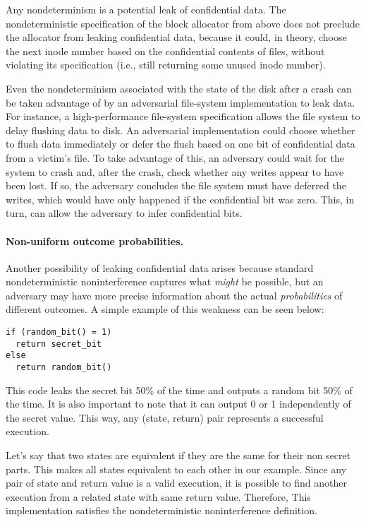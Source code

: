 Any nondeterminism is a potential leak of confidential data.  The
nondeterministic specification of the block allocator from above does not
preclude the allocator from leaking confidential data, because it could,
in theory, choose the next inode number based on the confidential contents
of files, without violating its specification (i.e., still returning some
unused inode number).

Even the nondeterminism associated with the state of the disk
after a crash can be taken advantage of by an adversarial file-system
implementation to leak data.  For instance, a high-performance
file-system specification allows the file system to delay flushing data
to disk.  An adversarial implementation could choose whether to flush
data immediately or defer the flush based on one bit of confidential
data from a victim's file.  To take advantage of this, an adversary
could wait for the system to crash and, after the crash, check whether
any writes appear to have been lost.  If so, the adversary concludes
the file system must have deferred the writes, which would have only
happened if the confidential bit was zero.  This, in turn, can allow
the adversary to infer confidential bits.

\paragraph{Non-uniform outcome probabilities.}
Another possibility of leaking confidential data
arises because standard nondeterministic noninterference
captures what \emph{might} be possible, but an adversary may have
more precise information about the actual \emph{probabilities} of
different outcomes. A simple example of this weakness can be seen below: 
%
\begin{verbatim}
if (random_bit() = 1)
  return secret_bit
else
  return random_bit()
\end{verbatim}
%
This code leaks the secret bit 50\% of the time and outputs a random bit 50\% of the time. It is also important to note that it can output 0 or 1 independently of the secret value. This way, any (state, return) pair represents a successful execution. 

Let’s say that two states are equivalent if they are the same for their non secret parts. This makes all states equivalent to each other in our example. Since any pair of state and return value is a valid execution, it is possible to find another execution from a related state with same return value. Therefore, This implementation satisfies the nondeterministic noninterference definition. 

